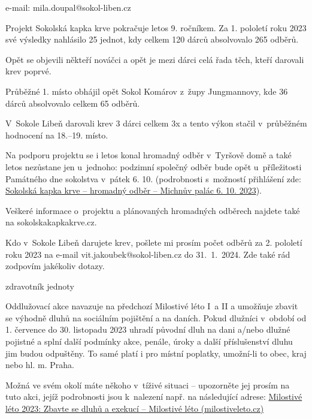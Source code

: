 \documentclass[11pt]{article}
\begin{document}
\signature{Miloslav Doupal}{e-mail: mila.doupal@sokol-liben.cz}

\clearpage

Projekt Sokolská kapka krve pokračuje letos 9. ročníkem. Za 1. pololetí roku 2023 své výsledky nahlásilo 25 jednot, kdy celkem 120 dárců absolvovalo 265 odběrů. 

Opět se objevili někteří nováčci a opět je mezi dárci celá řada těch, kteří darovali krev poprvé. 

Průběžné 1. místo obhájil opět Sokol Komárov z~župy Jungmannovy, kde 36 dárců absolvovalo celkem 65 odběrů.

V~Sokole Libeň darovali krev 3 dárci celkem 3x a tento výkon stačil v~průběžném hodnocení na 18.–⁠19. místo. 

Na podporu projektu se i letos konal hromadný odběr v~Tyršově domě a také letos nezůstane jen u~jednoho: podzimní společný odběr bude opět u~příležitosti Památného dne sokolstva v~pátek 6. 10. (podrobnosti s~možností přihlášení zde: \href{https://sokol.eu/akce/sokolska-kapka-krve-hromadny-odber-michnuv-palac-6-10-2023}{Sokolská kapka krve –⁠⁠ hromadný odběr –⁠ Michnův palác 6. 10. 2023}).

Veškeré informace o~projektu a plánovaných hromadných odběrech najdete také na sokolskakapkakrve.cz.

Kdo v~Sokole Libeň darujete krev, pošlete mi prosím počet odběrů za 2. pololetí roku 2023 na e-mail vit.jakoubek@sokol-liben.cz do 31.~1.~2024. Zde také rád zodpovím jakékoliv dotazy. 


\signature{Vít Jakoubek}{zdravotník jednoty}

\vspace*{24pt}


Oddlužovací akce navazuje na předchozí Milostivé léto I~a II a umožňuje zbavit se výhodně dluhů na sociálním pojištění a na daních. Pokud dlužníci v~období od 1. července do 30. listopadu 2023 uhradí původní dluh na dani a/nebo dlužné pojistné a splní další podmínky akce, penále, úroky a další příslušenství dluhu jim budou odpuštěny. To samé platí i pro místní poplatky, umožní-li to obec, kraj nebo hl. m. Praha.

Možná ve svém okolí máte někoho v~tíživé situaci –⁠ upozorněte jej prosím na tuto akci, jejíž podrobnosti jsou k~nalezení např. na následující adrese:
\href{https://milostiveleto.cz/}{Milostivé léto 2023: Zbavte se dluhů a exekucí –⁠ Milostivé léto (milostiveleto.cz)}
\end{document}
